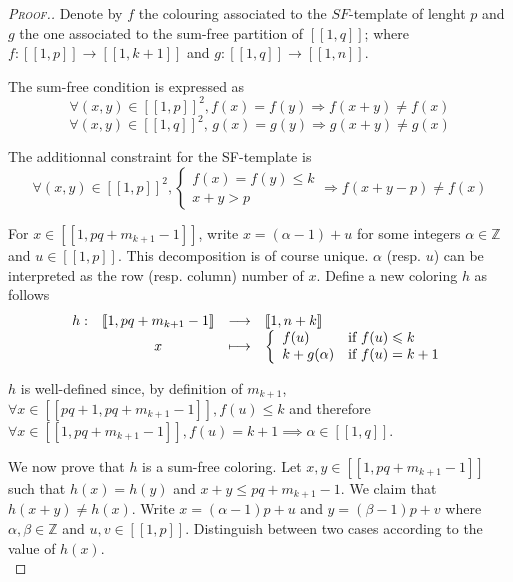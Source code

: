 \begin{proof}[\textsc{Proof.}]
Denote by \(f\) the colouring associated to the \(SF\)-template of lenght \(p\) and \(g\) the one associated 
to the sum-free partition of \([\![1,q]\!]\); where \(f : [\![1,p]\!] \longrightarrow [\![1,k+1]\!]\) and 
\(g : [\![1,q]\!] \longrightarrow [\![1,n]\!]\).

\par
The sum-free condition is expressed as
\[\forall (x,y) \in [\![1,p]\!]^2, f(x) = f(y) \Longrightarrow f(x+y) \neq f(x)\]
\[\forall (x,y) \in [\![1,q]\!]^2 \text{, } g(x) = g(y) \Longrightarrow g(x+y) \neq g(x)\]

The additionnal constraint for the SF-template is
\[
\forall (x,y) \in [\![1,p]\!]^2, \left\{
\begin{array}{ll}
	f(x) = f(y) \leqslant k \\
	x + y > p
\end{array}
\right. \Longrightarrow f(x+y-p) \neq f(x)
\]

For \(x \in [\![1,pq+m_{k+1}-1]\!]\), write \(x = (\alpha - 1) + u\) for some integers \(\alpha \in \mathbb{Z}\) and 
\(u \in [\![1,p]\!]\). This decomposition is of course unique. \(\alpha\) (resp. \(u\)) can be interpreted as the row 
(resp. column) number of \(x\). Define a new coloring \(h\) as follows
\[
\begin{array}{c c c l}
	h : & [\![1,pq+m_{k+1}-1]\!] & \longrightarrow & [\![1,n+k]\!] \\
	& x & \longmapsto & 
	\left\{ \begin{array}{l l}
		f(u) & \text{if}~f(u) \leqslant k \\
		k + g(\alpha) & \text{if}~f(u) = k + 1 \\
	\end{array} \right.
\end{array}
\]

\(h\) is well-defined since, by definition of \(m_{k+1}\), \(\forall x \in [\![p q + 1, p q + m_{k + 1} - 1 ]\!], f(u) 
\leqslant k\) and therefore \(\forall x \in [\![1,pq+m_{k+1}-1]\!], f(u) = k + 1 \implies \alpha \in [\![1, q]\!]\).

\par
We now prove that \(h\) is a sum-free coloring. Let \(x,y \in [\![1,pq + m_{k+1}-1]\!]\) such that \(h(x) = h(y)\) 
and \(x+y \leqslant pq+m_{k+1}-1\). We claim that \(h(x+y) \neq h(x)\). Write \(x = (\alpha - 1) p + u\) and 
\(y = (\beta - 1) p + v\) where \(\alpha, \beta \in \mathbb{Z}\) and \(u, v \in [\![1,p]\!]\). Distinguish between 
two cases according to the value of \(h(x)\). \\


\end{proof}
